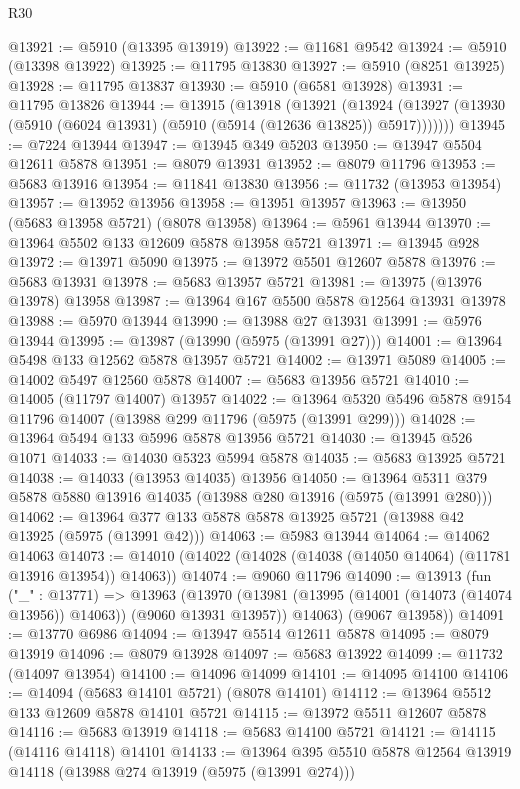 \begin{lexlean}{R30}
\begin{coremodule}
@13921 := @5910 (@13395 @13919)
@13922 := @11681 @9542
@13924 := @5910 (@13398 @13922)
@13925 := @11795 @13830
@13927 := @5910 (@8251 @13925)
@13928 := @11795 @13837
@13930 := @5910 (@6581 @13928)
@13931 := @11795 @13826
@13944 := @13915
    (@13918
      (@13921
        (@13924 (@13927 (@13930 (@5910 (@6024 @13931) (@5910 (@5914 (@12636 @13825)) @5917)))))))
@13945 := @7224 @13944
@13947 := @13945 @349 @5203
@13950 := @13947 @5504 @12611 @5878
@13951 := @8079 @13931
@13952 := @8079 @11796
@13953 := @5683 @13916
@13954 := @11841 @13830
@13956 := @11732 (@13953 @13954)
@13957 := @13952 @13956
@13958 := @13951 @13957
@13963 := @13950 (@5683 @13958 @5721) (@8078 @13958)
@13964 := @5961 @13944
@13970 := @13964 @5502 @133 @12609 @5878 @13958 @5721
@13971 := @13945 @928
@13972 := @13971 @5090
@13975 := @13972 @5501 @12607 @5878
@13976 := @5683 @13931
@13978 := @5683 @13957 @5721
@13981 := @13975 (@13976 @13978) @13958
@13987 := @13964 @167 @5500 @5878 @12564 @13931 @13978
@13988 := @5970 @13944
@13990 := @13988 @27 @13931
@13991 := @5976 @13944
@13995 := @13987 (@13990 (@5975 (@13991 @27)))
@14001 := @13964 @5498 @133 @12562 @5878 @13957 @5721
@14002 := @13971 @5089
@14005 := @14002 @5497 @12560 @5878
@14007 := @5683 @13956 @5721
@14010 := @14005 (@11797 @14007) @13957
@14022 := @13964 @5320 @5496 @5878 @9154 @11796 @14007 (@13988 @299 @11796 (@5975 (@13991 @299)))
@14028 := @13964 @5494 @133 @5996 @5878 @13956 @5721
@14030 := @13945 @526 @1071
@14033 := @14030 @5323 @5994 @5878
@14035 := @5683 @13925 @5721
@14038 := @14033 (@13953 @14035) @13956
@14050 := @13964 @5311 @379 @5878 @5880 @13916 @14035 (@13988 @280 @13916 (@5975 (@13991 @280)))
@14062 := @13964 @377 @133 @5878 @5878 @13925 @5721 (@13988 @42 @13925 (@5975 (@13991 @42)))
@14063 := @5983 @13944
@14064 := @14062 @14063
@14073 := @14010 (@14022 (@14028 (@14038 (@14050 @14064) (@11781 @13916 @13954)) @14063))
@14074 := @9060 @11796
@14090 := @13913
    (fun ("_" : @13771) =>
    @13963
      (@13970
        (@13981 (@13995 (@14001 (@14073 (@14074 @13956)) @14063)) (@9060 @13931 @13957))
        @14063)
      (@9067 @13958))
@14091 := @13770 @6986
@14094 := @13947 @5514 @12611 @5878
@14095 := @8079 @13919
@14096 := @8079 @13928
@14097 := @5683 @13922
@14099 := @11732 (@14097 @13954)
@14100 := @14096 @14099
@14101 := @14095 @14100
@14106 := @14094 (@5683 @14101 @5721) (@8078 @14101)
@14112 := @13964 @5512 @133 @12609 @5878 @14101 @5721
@14115 := @13972 @5511 @12607 @5878
@14116 := @5683 @13919
@14118 := @5683 @14100 @5721
@14121 := @14115 (@14116 @14118) @14101
@14133 := @13964 @395 @5510 @5878 @12564 @13919 @14118 (@13988 @274 @13919 (@5975 (@13991 @274)))

\end{coremodule}
\end{lexlean}
